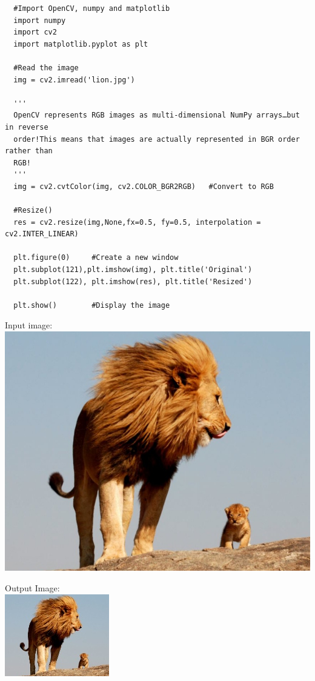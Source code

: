 \documentclass[]{article}
\begin{document}
\begin{verbatim}
  #Import OpenCV, numpy and matplotlib
  import numpy
  import cv2
  import matplotlib.pyplot as plt

  #Read the image
  img = cv2.imread('lion.jpg')

  '''
  OpenCV represents RGB images as multi-dimensional NumPy arrays…but in reverse
  order!This means that images are actually represented in BGR order rather than
  RGB!
  '''
  img = cv2.cvtColor(img, cv2.COLOR_BGR2RGB)   #Convert to RGB

  #Resize()
  res = cv2.resize(img,None,fx=0.5, fy=0.5, interpolation = cv2.INTER_LINEAR)

  plt.figure(0)     #Create a new window
  plt.subplot(121),plt.imshow(img), plt.title('Original')
  plt.subplot(122), plt.imshow(res), plt.title('Resized')

  plt.show()        #Display the image
\end{verbatim}

Input image:\\
\includegraphics{original.jpg}

Output Image:\\
\includegraphics{res.jpg}
\end{document}
